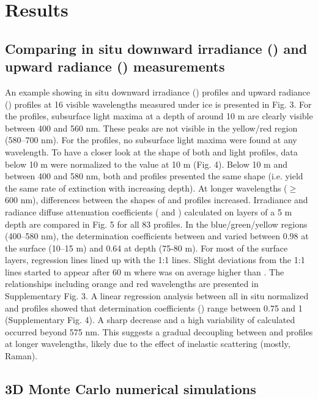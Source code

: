 \section{Results}

\subsection{Comparing in situ downward irradiance (\ed{}) and upward radiance (\lu{}) measurements}

An example showing in situ downward irradiance (\ed{}) profiles and upward radiance (\lu{}) profiles at 16 visible wavelengths measured under ice is presented in Fig. 3. For the \ed{} profiles, subsurface light maxima at a depth of around 10 m are clearly visible between 400 and 560 nm. These peaks are not visible in the yellow/red region (580--700 nm). For the \lu{} profiles, no subsurface light maxima were found at any wavelength. To have a closer look at the shape of both \ed{} and \lu{} light profiles, data below 10 m were normalized to the value at 10 m (Fig. 4). Below 10 m and between 400 and 580 nm, both \ed{} and \lu{} profiles presented the same shape (i.e. yield the same rate of extinction with increasing depth). At longer wavelengths ($\ge$ 600 nm), differences between the shapes of \ed{} and \lu{} profiles increased. Irradiance and radiance diffuse attenuation coefficients (\ked{} and \klu{}) calculated on layers of a 5 m depth are compared in Fig. 5 for all 83 profiles. In the blue/green/yellow regions (400--580 nm), the determination coefficients between \klu{} and \ked{} varied between 0.98 at the surface (10--15 m) and 0.64 at depth (75-80 m). For most of the surface layers, regression lines lined up with the 1:1 lines. Slight deviations from the 1:1 lines started to appear after 60 m where \ked{} was on average higher than \klu{}. The relationships including orange and red wavelengths are presented in Supplementary Fig. 3. A linear regression analysis between all in situ normalized \ed{} and \lu{} profiles showed that determination coefficients (\rsquared{}) range between 0.75 and 1 (Supplementary Fig. 4). A sharp decrease and a high variability of calculated \rsquared{} occurred beyond 575 nm. This suggests a gradual decoupling between \ed{} and \lu{} profiles at longer wavelengths, likely due to the effect of inelastic scattering (mostly, Raman). 

\subsection{3D Monte Carlo numerical simulations}

